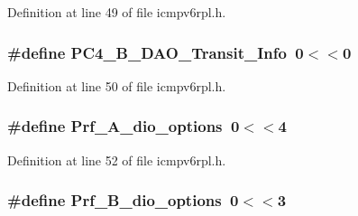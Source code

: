 Definition at line 49 of file icmpv6rpl.\+h.

\subsubsection[{\texorpdfstring{P\+C4\+\_\+\+B\+\_\+\+D\+A\+O\+\_\+\+Transit\+\_\+\+Info}{PC4_B_DAO_Transit_Info}}]{\setlength{\rightskip}{0pt plus 5cm}\#define P\+C4\+\_\+\+B\+\_\+\+D\+A\+O\+\_\+\+Transit\+\_\+\+Info~0$<$$<$0}\hypertarget{group___i_c_m_pv6_r_p_l_ga554e0487c145ca7a58180fc68a8124b5}{}\label{group___i_c_m_pv6_r_p_l_ga554e0487c145ca7a58180fc68a8124b5}


Definition at line 50 of file icmpv6rpl.\+h.

\subsubsection[{\texorpdfstring{Prf\+\_\+\+A\+\_\+dio\+\_\+options}{Prf_A_dio_options}}]{\setlength{\rightskip}{0pt plus 5cm}\#define Prf\+\_\+\+A\+\_\+dio\+\_\+options~0$<$$<$4}\hypertarget{group___i_c_m_pv6_r_p_l_ga9d6ec6543b7bff16d8d84df14fdee91f}{}\label{group___i_c_m_pv6_r_p_l_ga9d6ec6543b7bff16d8d84df14fdee91f}


Definition at line 52 of file icmpv6rpl.\+h.

\subsubsection[{\texorpdfstring{Prf\+\_\+\+B\+\_\+dio\+\_\+options}{Prf_B_dio_options}}]{\setlength{\rightskip}{0pt plus 5cm}\#define Prf\+\_\+\+B\+\_\+dio\+\_\+options~0$<$$<$3}\hypertarget{group___i_c_m_pv6_r_p_l_gaaeaa18d2b800967f481707f376852a50}{}\label{group___i_c_m_pv6_r_p_l_gaaeaa18d2b800967f481707f376852a50}


